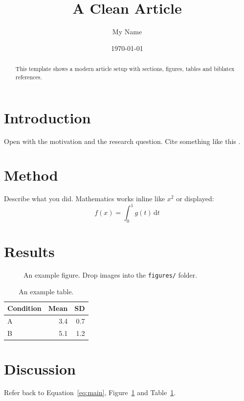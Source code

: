 \documentclass[11pt]{article}
\title{A Clean Article}
\author{My Name}
\date{\today}
\begin{document}
\maketitle

\begin{abstract}
This template shows a modern article setup with sections, figures, tables and biblatex references.
\end{abstract}

\section{Introduction}
Open with the motivation and the research question. Cite something like this \cite{knuth1984}.

\section{Method}
Describe what you did. Mathematics works inline like $x^2$ or displayed:
\begin{equation}
  \label{eq:main}
  f(x) = \int_0^1 g(t)\,\mathrm{d}t
\end{equation}

\section{Results}
\begin{figure}[ht]
  \centering
  \caption{An example figure. Drop images into the \texttt{figures/} folder.}
  \label{fig:example}
\end{figure}

\begin{table}[ht]
  \centering
  \caption{An example table.}
  \label{tab:example}
  \begin{tabular}{lrr}
    \toprule
    Condition & Mean & SD \\
    \midrule
    A & 3.4 & 0.7 \\
    B & 5.1 & 1.2 \\
    \bottomrule
  \end{tabular}
\end{table}

\section{Discussion}
Refer back to Equation~\ref{eq:main}, Figure~\ref{fig:example} and Table~\ref{tab:example}.

\printbibliography
\end{document}
